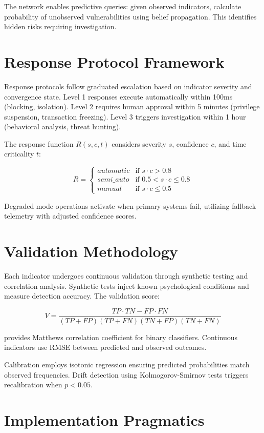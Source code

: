 \documentclass[10pt, twocolumn]{article}
\begin{document}
The network enables predictive queries: given observed indicators, calculate probability of unobserved vulnerabilities using belief propagation. This identifies hidden risks requiring investigation.

\section{Response Protocol Framework}

Response protocols follow graduated escalation based on indicator severity and convergence state. Level 1 responses execute automatically within 100ms (blocking, isolation). Level 2 requires human approval within 5 minutes (privilege suspension, transaction freezing). Level 3 triggers investigation within 1 hour (behavioral analysis, threat hunting).

The response function $R(s, c, t)$ considers severity $s$, confidence $c$, and time criticality $t$:

$$R = \begin{cases}
automatic & \text{if } s \cdot c > 0.8 \\
semi\_auto & \text{if } 0.5 < s \cdot c \leq 0.8 \\
manual & \text{if } s \cdot c \leq 0.5
\end{cases}$$

Degraded mode operations activate when primary systems fail, utilizing fallback telemetry with adjusted confidence scores.

\section{Validation Methodology}

Each indicator undergoes continuous validation through synthetic testing and correlation analysis. Synthetic tests inject known psychological conditions and measure detection accuracy. The validation score:

$$V = \frac{TP \cdot TN - FP \cdot FN}{(TP + FP)(TP + FN)(TN + FP)(TN + FN)}$$

provides Matthews correlation coefficient for binary classifiers. Continuous indicators use RMSE between predicted and observed outcomes.

Calibration employs isotonic regression ensuring predicted probabilities match observed frequencies. Drift detection using Kolmogorov-Smirnov tests triggers recalibration when $p < 0.05$.

\section{Implementation Pragmatics}
\end{document}
